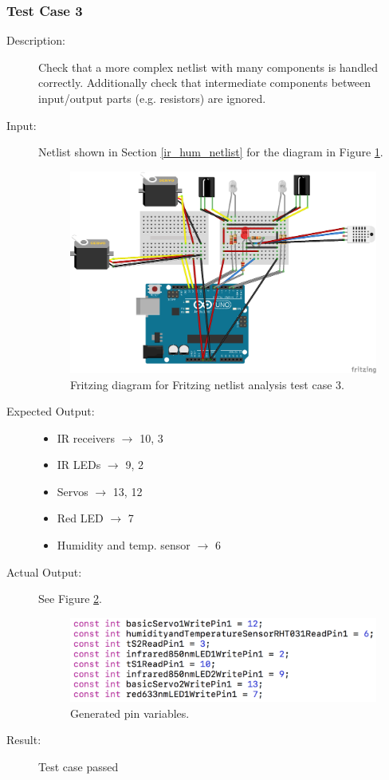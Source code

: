 \documentclass{UoYCSproject}
\begin{document}
\subsubsection{Test Case 3}
\begin{description}
\item[Description:] Check that a more complex netlist with many components is handled correctly. Additionally check that intermediate components between input/output parts (e.g. resistors) are ignored.

\item[Input:] Netlist shown in Section \ref{ir_hum_netlist} for the diagram in Figure \ref{fig:ir_hum_diagram}.
\begin{figure}[h!]
  \centering
  \includegraphics[width=0.7\linewidth]{graphics/ir_humidity_sensors.png}
  \caption{Fritzing diagram for Fritzing netlist analysis test case 3.}
  \label{fig:ir_hum_diagram}
\end{figure}
\item[Expected Output:] 
\begin{itemize}
\item IR receivers $\rightarrow$ 10, 3
\item IR LEDs $\rightarrow$ 9, 2
\item Servos $\rightarrow$ 13, 12
\item Red LED $\rightarrow$ 7
\item Humidity and temp. sensor $\rightarrow$ 6
\end{itemize}
\item[Actual Output:] See Figure \ref{fig:ir_hum_out}.
\begin{figure}[h!]
  \centering
  \includegraphics[width=0.7\linewidth]{graphics/cs1_gen_pins.png}
  \caption{Generated pin variables.}
  \label{fig:ir_hum_out}
\end{figure}
\item[Result:] Test case passed
\end{description}
\end{document}
